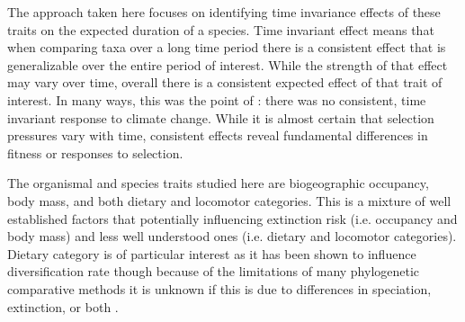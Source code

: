 \documentclass[12pt,letterpaper]{article}
\begin{document}
The approach taken here focuses on identifying time invariance effects of these traits on the expected duration of a species. Time invariant effect means that when comparing taxa over a long time period there is a consistent effect that is generalizable over the entire period of interest. While the strength of that effect may vary over time, overall there is a consistent expected effect of that trait of interest. In many ways, this was the point of \citet{Alroy2000g}: there was no consistent, time invariant response to climate change. While it is almost certain that selection pressures vary with time, consistent effects reveal fundamental differences in fitness or responses to selection. %

The organismal and species traits studied here are biogeographic occupancy, body mass, and both dietary and locomotor categories. This is a mixture of well established factors that potentially influencing extinction risk (i.e. occupancy and body mass) and less well understood ones (i.e. dietary and locomotor categories). Dietary category is of particular interest as it has been shown to influence diversification rate \citep{Price2012} though because of the limitations of many phylogenetic comparative methods it is unknown if this is due to differences in speciation, extinction, or both \citep{Rabosky2010a}.
\end{document}
